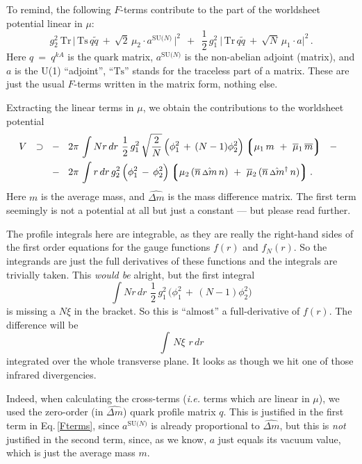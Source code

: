 \documentclass[12pt]{article}
\def\beq{\begin{equation}}
\def\eeq{\end{equation}}
\newcommand{\wt}{\widetilde}
\newcommand{\ov}{\overline}
\newcommand{\lgr}{\left\lgroup}
\newcommand{\rgr}{\right\rgroup}
\newcommand{\aN}{a^\text{SU($N$)}}
\newcommand{\Tr}{\text{Tr}}
\newcommand{\Ts}{\text{Ts}}
\newcommand{\dm}{\hat{{\scriptstyle \Delta} m}}
\begin{document}
	To remind, the following $ F $-terms contribute to the part of the worldsheet potential linear in $ \mu $:
\beq
\label{Fterms}
	g_2^2~ \Tr\, \Big|\, \Ts\, q \wt{q} ~+~ \sqrt{2}\, \mu_2 \cdot \aN \,\Big|^2  ~~+~~
	\frac{1}{2}\,g_1^2~ \Big|\, \Tr\, q\wt{q} ~+~ \sqrt{N}\, \mu_1 \cdot a \Big|^2\,.
\eeq
	Here $ q ~=~ q^{kA} $ is the quark matrix, $ \aN $ is the non-abelian adjoint (matrix), and $ a $ is the U(1) ``adjoint'',
	``$ \Ts $'' stands for the traceless part of a matrix.
	These are just the usual $ F $-terms written in the matrix form, nothing else.

	Extracting the linear terms in $ \mu $, we obtain the contributions to the worldsheet potential
\begin{align}
%
\notag
	V  ~~\supset~~ & -~~ 2\pi\, \int N r\, dr\,\, \frac{1}{2}\, g_1^2\, \sqrt{\frac{2}{N}}\, \Big( \phi_1^2 \,+\, (N-1)\phi_2^2 \Big)
						\lgr \mu_1\, m  ~+~ \ov{\mu}{}_1\, \ov{m} \rgr  ~~-~~
	\\
%
	& 
	-~~ 2\pi\, \int r\, dr\, g_2^2\, \Big( \phi_1^2 \,-\, \phi_2^2 \Big) 
						\lgr \mu_2\, (\ov{n}\, \dm\, n)  ~+~  \ov{\mu}{}_2\, ( \ov{n}\, \dm{}^\dag\, n ) \rgr.
\end{align}
	Here $ m $ is the average mass, and $ \dm $ is the mass difference matrix.
	The first term seemingly is not a potential at all but just a constant --- but please read further.

	The profile integrals here are integrable, as they are really the right-hand sides of the first order equations 
	for the gauge functions $ f(r) $ and $ f_N(r) $. 
	So the integrands are just the full derivatives of these functions and the integrals are trivially taken.
	This \emph{would be} alright, but the first integral 
\beq
	\int N r\, dr\,\, \frac{1}{2}\, g_1^2\, \Big( \phi_1^2 \,+\, (N-1)\phi_2^2 \Big)
\eeq
	is missing a $ N\xi $ in the bracket.
	So this is ``almost'' a full-derivative of $ f(r) $.
	The difference will be 
\[
	\int\, N \xi\,\, r\, dr
\]
	integrated over the whole transverse plane.
	It looks as though we hit one of those infrared divergencies. 

	Indeed, when calculating the cross-terms ({\it i.e.} terms which are linear in $ \mu $), we used the zero-order (in $ \dm $) 
	quark profile matrix $ q $.
	This is justified in the first term in Eq.\,\eqref{Fterms}, since $ \aN $ is already proportional to $ \dm $,
	but this is \emph{not} justified in the second term, since, as we know, $ a $ just equals its vacuum value, which is just the 
	average mass $ m $.
\end{document}
